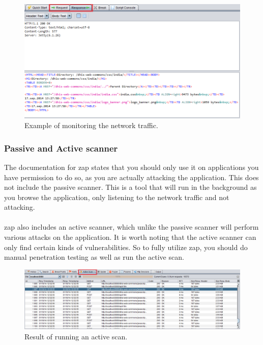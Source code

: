 \documentclass[11pt,english,a4paper]{report}
\begin{document}
\begin{figure}[h]
    \centering
    \includegraphics[scale=0.45]{images/zap-right-menu.png}
    \caption{Example of monitoring the network traffic. }
    \label{fig:zaprightmenu}
\end{figure}

\subsubsection{Passive and Active scanner}
The documentation for \gls{zap} states that you should only use it on applications you have permission to do so, as you are actually attacking the application. 
This does not include the passive scanner. 
This is a tool that will run in the background as you browse the application, only listening to the network traffic and not attacking.

\paragraph{}
\gls{zap} also includes an active scanner, which unlike the passive scanner will perform various attacks on the application. 
It is worth noting that the active scanner can only find certain kinds of vulnerabilities. 
So to fully utilize \gls{zap}, you should do manual penetration testing as well as run the active scan.

\begin{figure}[h]
    \centering
    \includegraphics[scale=0.35]{images/zap-active-scan.png}
    \caption{Result of running an active scan. }
    \label{fig:zapactivescan}
\end{figure}
\end{document}
